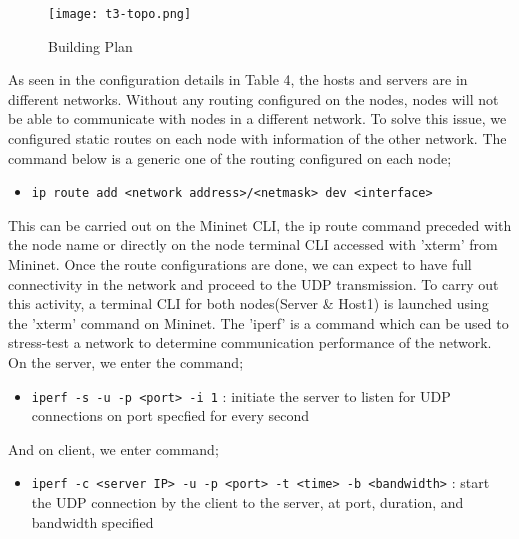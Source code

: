 \documentclass{article}
\begin{document}
    	\begin{figure}[h]
        		\centering
        		\texttt{[image: t3-topo.png]}
        		\caption{Building Plan}
        		\label{fig:t3-1}
    	\end{figure}
\newpage
\par As seen in the configuration details in Table 4, the hosts and servers are in different networks. Without any routing configured on the nodes, nodes will not be able to communicate with nodes in a different network. To solve this issue, we configured static routes on each node with information of the other network. The command below is a generic one of the routing configured on each node; 
	\begin{itemize}
		\item \texttt{ip route add <network address>/<netmask>  dev <interface>}
	\end{itemize}
This can be carried out on the Mininet CLI, the ip route command preceded with the node name or directly on the node terminal CLI accessed with 'xterm' from Mininet. Once the route configurations are done, we can expect to have full connectivity in the network and proceed to the UDP transmission. To carry out this activity, a terminal CLI for both nodes(Server \& Host1) is launched using the 'xterm' command on Mininet. The 'iperf' is a command which can be used to stress-test a network to determine communication performance of the network. \\ On the server, we enter the command; 
	\begin{itemize}
		\item \texttt{iperf -s -u -p <port> -i 1} : initiate the server to listen for UDP connections on port specfied for every second
	\end{itemize}
And on client, we enter command;
	\begin{itemize}
		\item \texttt{iperf -c <server IP> -u -p <port> -t <time> -b <bandwidth>} : start the UDP connection by the client to the server, at port, duration, and bandwidth specified
	\end{itemize}
\end{document}
